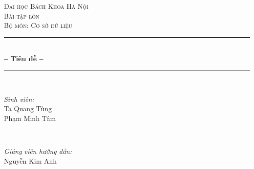 \documentclass[12pt]{report}
\begin{document}
\begin{titlepage}

\newcommand{\HRule}{\rule{\linewidth}{0.5mm}} %

\center %
 

\textsc{\Huge Đại học Bách Khoa Hà Nội}\\[1cm] %
\textsc{\Large Bài tập lớn}\\[0.3cm]
\textsc{\large Bộ môn: Cơ sở dữ liệu}\\[0.5cm] %


\HRule \\[0.4cm]
{ \huge \bfseries -- Tiêu đề --}\\[0.03cm] %
\HRule \\[1.5cm]

 

\begin{minipage}{0.4\textwidth}
\begin{flushleft} \large
\emph{Sinh viên:}\\
Tạ Quang Tùng\\
Phạm Minh Tâm
\end{flushleft}
\end{minipage}
~
\begin{minipage}{0.4\textwidth}
\begin{flushright} \large
\emph{Giảng viên hướng dẫn:} \\
Nguyễn Kim Anh
\end{flushright}
\end{minipage}\\[3cm]


\end{titlepage}
\end{document}

